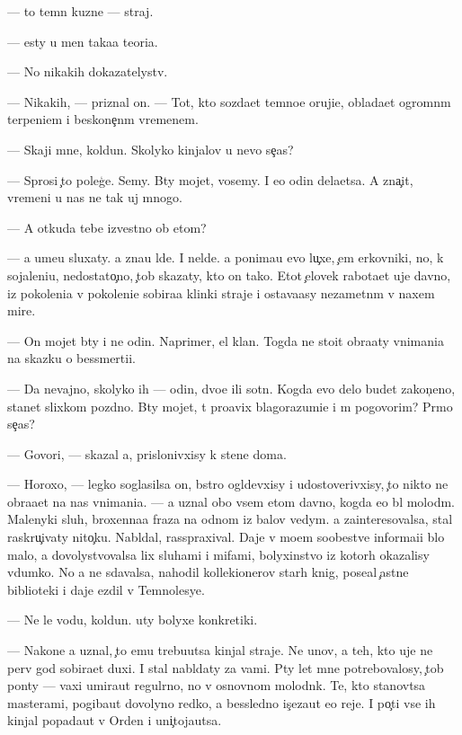 \documentclass[10pt]{book}
\begin{document}
— {\C}to temn{\yi}{\y} kuzne{\q} — straj.

— {\Y}esty u men{\ia} taka{\y}a teori{\y}a.

— No nikakih dokazatelystv.

— Nikakih, — priznal on. — Tot, kto sozda{\y}et temno{\y}e oruji{\y}e, oblada{\y}et ogromn{\yi}m terpeni{\y}em i beskone{\c}n{\yi}m vremenem.

— Skaji mne, koldun. Skolyko kinjalov u nevo se{\y}{\c}as?

— Sprosi {\c}to poleg{\c}e. Semy. B{\yi}ty mojet, vosemy. I {\y}e{\x}o odin dela{\y}etsa. A zna{\c}it, vremeni u nas ne tak uj mnogo.

— A otkuda tebe izvestno ob etom?

— {\Y}a ume{\y}u sluxaty. {\Y}a zna{\y}u l{\iu}de{\y}. I nel{\iu}de{\y}. {\Y}a ponima{\y}u {\y}evo lu{\c}xe, {\c}em {\q}erkovniki, no, k sojaleni{\y}u, nedostato{\c}no, {\c}tob{\yi} skazaty, kto on tako{\y}. Etot {\c}elovek rabota{\y}et uje davno, iz pokoleni{\y}a v pokoleni{\y}e sobira{\y}a klinki straje{\y} i ostava{\y}asy nezametn{\yi}m v naxem mire.

— On mojet b{\yi}ty i ne odin. Naprimer, {\q}el{\yi}{\y} klan. Togda ne sto{\y}it obra{\x}aty vnimani{\y}a na skazku o bessmerti{\y}i.

— Da nevajno, skolyko ih — odin, dvo{\y}e ili sotn{\ia}. Kogda {\y}evo delo budet zakon{\c}eno, stanet slixkom pozdno. B{\yi}ty mojet, t{\yi} pro{\y}avix blagorazumi{\y}e i m{\yi} pogovorim? Pr{\ia}mo se{\y}{\c}as?

— Govori, — skazal {\y}a, prislonivxisy k stene doma.

— Horoxo, — legko soglasilsa on, b{\yi}stro ogl{\ia}devxisy i udostoverivxisy, {\c}to nikto ne obra{\x}a{\y}et na nas vnimani{\y}a. — {\Y}a uznal obo vsem etom davno, kogda {\y}e{\x}o b{\yi}l molod{\yi}m. Malenyki{\y} sluh, broxenna{\y}a fraza na odnom iz balov vedym. {\Y}a za{\y}interesovalsa, stal raskru{\c}ivaty nito{\c}ku. Nabl{\iu}dal, rasspraxival. Daje v mo{\y}em soob{\x}estve informa{\q}i{\y}i b{\yi}lo malo, {\y}a dovolystvovalsa lix sluhami i mifami, bolyxinstvo iz kotor{\yi}h okazalisy v{\yi}dumko{\y}. No {\y}a ne sdavalsa, nahodil kollek{\q}ionerov star{\yi}h knig, pose{\x}al {\c}astn{\yi}{\y}e biblioteki i daje {\y}ezdil v Temnolesye.

— Ne le{\y} vodu, koldun. {\C}uty bolyxe konkretiki.

— Nakone{\q} {\y}a uznal, {\c}to {\y}emu trebu{\y}utsa kinjal{\yi} straje{\y}. Ne {\y}un{\q}ov, a teh, kto uje ne perv{\yi}{\y} god sobira{\y}et duxi. I stal nabl{\iu}daty za vami. P{\ia}ty let mne potrebovalosy, {\c}tob{\yi} pon{\ia}ty — vaxi umira{\y}ut regul{\ia}rno, no v osnovnom molodn{\ia}k. Te, kto stanov{\ia}tsa masterami, pogiba{\y}ut dovolyno redko, a bessledno is{\c}eza{\y}ut {\y}e{\x}o reje. I po{\c}ti vse ih kinjal{\yi} popada{\y}ut v Orden i uni{\c}toja{\y}utsa.
\end{document}
